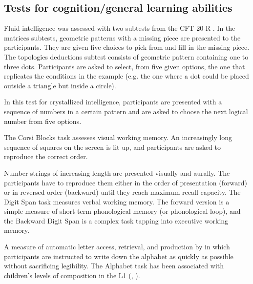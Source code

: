 \documentclass[output=paper]{langsci/langscibook}
\begin{document}
\subsection{Tests for cognition/general learning abilities}\largerpage
\begin{description}\sloppy
\item[CFT 20-R: Matrices and topological deductions {\upshape\citep{Weiss2006}}:]  Fluid intelligence was assessed with two subtests from the CFT 20-R \citep{Weiss2006}. In the matrices subtests, geometric patterns with a missing piece are presented to the participants. They are given five choices to pick from and fill in the missing piece. The topologies deductions subtest consists of geometric pattern containing one to three dots. Participants are asked to select, from five given options, the one that replicates the conditions in the example (e.g. the one where a dot could be placed outside a triangle but inside a circle).

\item[CFT-20-R: Number sequences {\upshape\citep{Weiss2006}}:]  In this test for crystallized intelligence, participants are presented with a sequence of numbers in a certain pattern and are asked to choose the next logical number from five options.

\item[Corsi Blocks:] The Corsi Blocks task assesses visual working memory. An increasingly long sequence of squares on the screen is lit up, and participants are asked to reproduce the correct order.

\item[Digit Span (Forward/Backward):] Number strings of increasing length are presented visually and aurally. The participants have to reproduce them either in the order of presentation (forward) or in reversed order (backward) until they reach maximum recall capacity. The Digit Span task measures verbal working memory. The forward version is a simple measure of short-term phonological memory (or phonological loop), and the Backward Digit Span is a complex task tapping into executive working memory.

\item[Alphabet Task:] A measure of automatic letter access, retrieval, and production by \citet{BerningerEtAl1992} in which participants are instructed to write down the alphabet as quickly as possible without sacrificing legibility. The Alphabet task has been associated with children’s levels of composition in the L1 (\citealt{BerningerEtAl1997}, \citealt{GrahamEtAl2006}).


\end{description}
\end{document}
